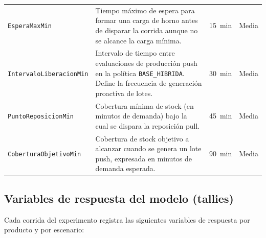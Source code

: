 \documentclass[12pt]{article}
\begin{document}
\begin{table}[H]
\begin{tabularx}{\textwidth}{lXcc}
\rowcolor{tabrow}\texttt{EsperaMaxMin}           & Tiempo máximo de espera para formar una carga de horno antes de disparar la corrida aunque no se alcance la carga mínima. & 15~min & Media \\
\texttt{IntervaloLiberacionMin} & Intervalo de tiempo entre evaluaciones de producción push en la política \texttt{BASE\_HIBRIDA}. Define la frecuencia de generación proactiva de lotes. & 30~min & Media \\
\rowcolor{tabrow}\texttt{PuntoReposicionMin}     & Cobertura mínima de stock (en minutos de demanda) bajo la cual se dispara la reposición pull. & 45~min & Media \\
\texttt{CoberturaObjetivoMin}   & Cobertura de stock objetivo a alcanzar cuando se genera un lote push, expresada en minutos de demanda esperada. & 90~min & Media \\
\bottomrule
\end{tabularx}
\end{table}

\subsection{Variables de respuesta del modelo (tallies)}

Cada corrida del experimento registra las siguientes variables de respuesta por producto y por escenario:
\end{document}
